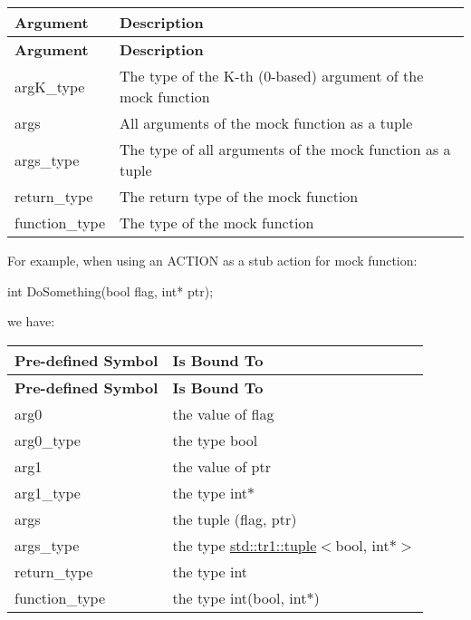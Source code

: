 \tabulinesep=1mm
\begin{longtabu} spread 0pt [c]{*{2}{|X[-1]}|}
\hline
\rowcolor{\tableheadbgcolor}\textbf{ Argument }&\textbf{ Description  }\\
\endfirsthead
\hline
\endfoot
\hline
\rowcolor{\tableheadbgcolor}\textbf{ Argument }&\textbf{ Description  }\\
\endhead
{\ttfamily arg\+K\+\_\+type} &The type of the K-\/th (0-\/based) argument of the mock function \\
{\ttfamily args} &All arguments of the mock function as a tuple \\
{\ttfamily args\+\_\+type} &The type of all arguments of the mock function as a tuple \\
{\ttfamily return\+\_\+type} &The return type of the mock function \\
{\ttfamily function\+\_\+type} &The type of the mock function \\
\end{longtabu}
For example, when using an {\ttfamily A\+C\+T\+I\+ON} as a stub action for mock function\+: 
\begin{DoxyCode}
\textcolor{keywordtype}{int} DoSomething(\textcolor{keywordtype}{bool} flag, \textcolor{keywordtype}{int}* ptr);
\end{DoxyCode}
 we have\+:

\tabulinesep=1mm
\begin{longtabu} spread 0pt [c]{*{2}{|X[-1]}|}
\hline
\rowcolor{\tableheadbgcolor}\textbf{ {\bfseries Pre-\/defined Symbol} }&\textbf{ {\bfseries Is Bound To}  }\\
\endfirsthead
\hline
\endfoot
\hline
\rowcolor{\tableheadbgcolor}\textbf{ {\bfseries Pre-\/defined Symbol} }&\textbf{ {\bfseries Is Bound To}  }\\
\endhead
{\ttfamily arg0} &the value of {\ttfamily flag} \\
{\ttfamily arg0\+\_\+type} &the type {\ttfamily bool} \\
{\ttfamily arg1} &the value of {\ttfamily ptr} \\
{\ttfamily arg1\+\_\+type} &the type {\ttfamily int$\ast$} \\
{\ttfamily args} &the tuple {\ttfamily (flag, ptr)} \\
{\ttfamily args\+\_\+type} &the type {\ttfamily \hyperlink{classstd_1_1tr1_1_1tuple}{std\+::tr1\+::tuple}$<$bool, int$\ast$$>$} \\
{\ttfamily return\+\_\+type} &the type {\ttfamily int} \\
{\ttfamily function\+\_\+type} &the type {\ttfamily int(bool, int$\ast$)} \\
\end{longtabu}
